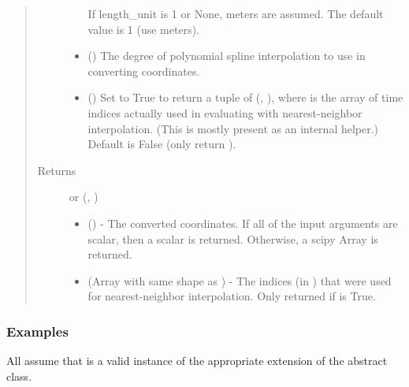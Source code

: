 \documentclass[letterpaper,10pt,english]{sphinxmanual}
\begin{document}
\begin{fulllineitems}
\begin{fulllineitems}
\begin{quote}
\begin{description}
\begin{itemize}
If length\_unit is 1 or None, meters are assumed. The default
value is 1 (use meters).


\item {} 
 () \textendash{} The degree of polynomial spline interpolation to
use in converting coordinates.

\item {} 
 () \textendash{} Set to True to return a tuple of (,
), where  is the array of time indices
actually used in evaluating  with nearest-neighbor
interpolation. (This is mostly present as an internal helper.)
Default is False (only return ).

\end{itemize}

\item[{Returns}] \leavevmode

 or (, )
\begin{itemize}
\item {} 
 () - The converted coordinates. If
all of the input arguments are scalar, then a scalar is returned.
Otherwise, a scipy Array is returned.

\item {} 
 (Array with same shape as ) - The indices
(in ) that were used for
nearest-neighbor interpolation. Only returned if  is
True.

\end{itemize}


\end{description}\end{quote}
\subsubsection*{Examples}

All assume that  is a valid instance of the appropriate
extension of the {\hyperref[\detokenize{eqtools:eqtools.core.Equilibrium}]{}} abstract class.


\end{fulllineitems}
\end{fulllineitems}
\end{document}
